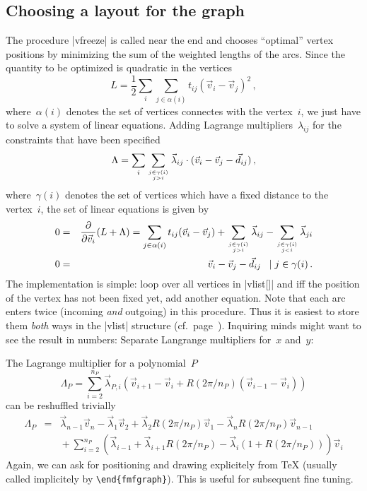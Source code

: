 \documentclass{article}
\begin{document}
\subsection{Choosing a layout for the graph}

The procedure |vfreeze| is called near the end and
chooses ``optimal'' vertex positions by minimizing the sum of the
weighted lengths of the arcs.  Since the quantity to be optimized is
quadratic in the vertices
\begin{equation}
  L = \frac{1}{2} \sum_i \sum_{j\in\alpha(i)}
        t_{ij} (\vec v_i - \vec v_j)^2\,,
\end{equation}
where~$\alpha(i)$ denotes the set of vertices connectes with the
vertex~$i$, we just have to solve a system of linear equations.
Adding Lagrange multipliers~$\lambda_{ij}$ for the constraints that
have been specified
\begin{equation}
  \Lambda = \sum_i \sum_{j\in\gamma(i) \atop j>i}
        \vec\lambda_{ij}\cdot(\vec v_i - \vec v_j - \vec d_{ij})\,,
\end{equation}
where~$\gamma(i)$ denotes the set of vertices which have a fixed
distance to the vertex~$i$, the set of linear equations is given by
\begin{eqnarray}
  0 & = & \frac{\partial}{\partial \vec v_i} (L+\Lambda)
           = \sum_{j\in\alpha(i)} t_{ij} (\vec v_i - \vec v_j)
             + \sum_{j\in\gamma(i) \atop j>i} \vec\lambda_{ij}
             - \sum_{j\in\gamma(i) \atop j<i} \vec\lambda_{ji} \\
  0 & = & \vec v_i - \vec v_j - \vec d_{ij}\;\; \mid  j \in \gamma(i)\,.
\end{eqnarray}
The implementation is simple: loop over all vertices in |vlist[]|
and iff the position of the vertex has not been fixed yet, add
another equation.  Note that each arc enters twice (incoming
\emph{and} outgoing) in this procedure.  Thus it is easiest to store
them \emph{both} ways in the |vlist| structure
(cf.~page~\pageref{pg:vconnect})\label{pg:vfreeze}.
Inquiring minds might want to see the result in numbers:
Separate Langrange multipliers for~$x$ and~$y$:

The Lagrange multiplier for a polynomial~$P$
\begin{equation}
  \Lambda_P = \sum_{i=2}^{n_P} \vec\lambda_{P,i}
    \left( \vec v_{i+1} - \vec v_i
            + R(2\pi/n_P) \left( \vec v_{i-1} - \vec v_i \right)
    \right)
\end{equation}
can be reshuffled trivially
\begin{eqnarray}
  \Lambda_P & = &
    \vec\lambda_{n-1} \vec v_{n}
    - \vec\lambda_1 \vec v_2
    + \vec\lambda_2 R(2\pi/n_P) \vec v_1
    - \vec\lambda_n R(2\pi/n_P) \vec v_{n-1} \\
    & & \mbox{} + \sum_{i=2}^{n_P}
        \left( \vec\lambda_{i-1} + \vec\lambda_{i+1} R(2\pi/n_P)
               - \vec\lambda_i (1 + R(2\pi/n_P)) \right) \vec v_i
        \nonumber
\end{eqnarray}
Again, we can ask for positioning and drawing explicitely from \TeX{}
(usually called implicitely by \verb|\end{fmfgraph}|).  This is useful for
subsequent fine tuning.

\end{document}
